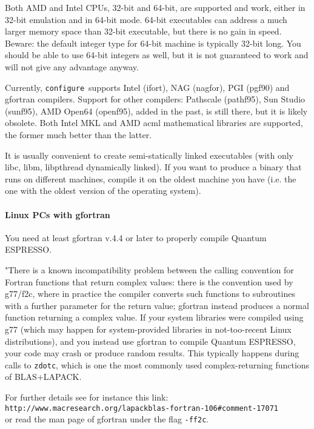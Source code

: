 \documentclass[12pt,a4paper]{article}
\def\qe{{\sc Quantum ESPRESSO}}
\def\configure{\texttt{configure}}
\begin{document}
Both AMD and Intel CPUs, 32-bit and 64-bit, are supported and work,
either in 32-bit emulation and in 64-bit mode. 64-bit executables
can address a much larger memory space than 32-bit executable, but
there is no gain in speed.
Beware: the default integer type for 64-bit machine is typically
32-bit long. You should be able to use 64-bit integers as well,
but it is not guaranteed to work and will not give
any advantage anyway.

Currently, \configure\ supports Intel (ifort), NAG (nagfor), PGI (pgf90)
and gfortran compilers. Support for other compilers: Pathscale
(pathf95), Sun Studio (sunf95), AMD Open64 (openf95), added in the past,
is still there, but it is likely obsolete.
Both Intel MKL and AMD acml mathematical libraries are supported, the
former much better than the latter.

It is usually convenient to create semi-statically linked executables (with only
libc, libm, libpthread dynamically linked). If you want to produce a binary
that runs on different machines, compile it on the oldest machine you have
(i.e. the one with the oldest version of the operating system).

\paragraph{Linux PCs with gfortran}

You need at least gfortran v.4.4 or later to properly compile \qe.

"There is a known incompatibility problem between the calling
convention for Fortran functions that return complex values: there is the
convention used by
g77/f2c, where in practice the compiler converts such functions to subroutines
with a further parameter for the return value; gfortran instead produces a
normal function returning a complex value.
If your system libraries were compiled using g77 (which may happen for
system-provided libraries in not-too-recent Linux distributions),
and you instead use gfortran to compile \qe, your code
may crash or produce random results. This typically happens
during calls to \texttt{zdotc}, which is one the most commonly used
complex-returning functions of BLAS+LAPACK.

For further details see for instance this link:\\
\texttt{http://www.macresearch.org/lapackblas-fortran-106\#comment-17071}\\
or read the man page of gfortran under the flag \texttt{-ff2c}.
\end{document}
